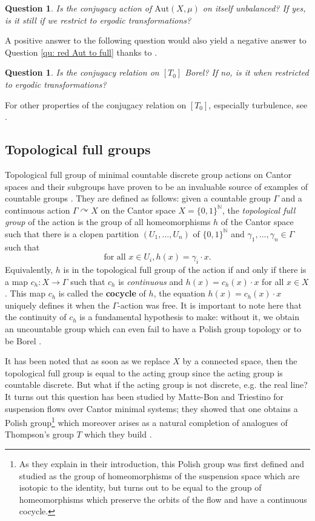 \documentclass{article}
\newtheorem{question}[theorem]{Question}
\theoremstyle{definition}
\begin{document}
\begin{question}
	Is the conjugacy action of $\mathrm{Aut}(X,\mu)$ on itself unbalanced? If yes, is it still if we restrict to ergodic transformations?
\end{question}

A positive answer to the following  question would also yield a negative answer to Question \ref{qu: red Aut to full} thanks to \cite{foremanconjugacyproblemergodic2011}.

\begin{question}
	Is the conjugacy relation on $[T_0]$ Borel? If no, is it when restricted to ergodic transformations?
\end{question}
For other properties of the conjugacy relation on $[T_0]$, especially turbulence, see \cite[Chap.~5]{kechrisGlobalaspectsergodic2010}.

\subsection{Topological full groups}
Topological full group of minimal countable discrete group actions on Cantor spaces and their subgroups have proven to be an invaluable source of examples of countable groups \cite{Matui,JM,nekrashevychSimplegroupsdynamical2017,nekrashevychPalindromicsubshiftssimple2018}.
They are defined as follows: given a countable group $\Gamma$ and a continuous action $\Gamma \curvearrowright X$ on the Cantor space $X=\{0,1\}^\mathbb{N}$, the \emph{topological full group} of the action is the group of all homeomorphisms $h$ of the Cantor space such that there is a clopen partition $(U_1,\dots,U_n)$ of $\{0,1\}^\mathbb{N}$ and $\gamma_1,\dots,\gamma_n\in\Gamma$ such that 
$$ \text{for all }x\in U_i, h(x)=\gamma_i\cdot x.$$
Equivalently, $h$ is in the topological full group of the action if and only if there is a map $c_h: X\to \Gamma$ such that $c_h$ is \emph{continuous} and $h(x)=c_h(x)\cdot x$ for all $x\in X$. This map $c_h$ is called the \textbf{cocycle} of $h$, the equation $h(x)=c_h(x)\cdot x$ uniquely defines it when the $\Gamma$-action was free. It is important to note here that the continuity of $c_h$ is a fundamental hypothesis to make: without it, we obtain an uncountable group which can even fail to have a Polish group topology or to be Borel \cite{ibarluciaFullGroupsMinimal2016}. 

It has been noted that as soon as we replace $X$ by a connected space, then the topological full group is equal to the acting group since the acting group is countable discrete. But what if the acting group is not discrete, e.g. the real line? It turns out this question has been studied by 
Matte-Bon and Triestino for suspension flows over Cantor minimal systems; they showed that one obtains a Polish group\footnote{ As they explain in their introduction, this Polish group was first defined and studied as the group of homeomorphisms of the suspension space which are isotopic to the identity, but turns out to be equal to the group of homeomorphisms which preserve the orbits of the flow and have a continuous cocycle.} which moreover arises as a natural completion of analogues of Thompson's group $T$ which they build \cite[Appendix A]{mattebonGroupsPiecewiseLinear2020}.
\end{document}
